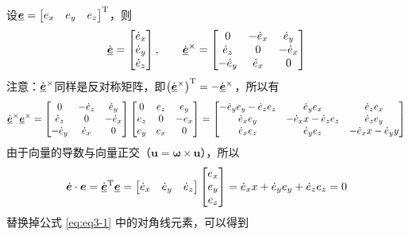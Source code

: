 \proof 设$\underline{\bm{e}} = \big[ e_x \quad e_y \quad e_z \big]^{\text{T}}$，则
\begin{equation*}
	\dot{\underline{\bm{e}}} =
	\begin{bmatrix}
		\dot{e}_x \\
		\dot{e}_y \\
		\dot{e}_z
	\end{bmatrix},
	\qquad 
	\dot{\underline{\bm{e}}}^\times =
	\begin{bmatrix}
		0 & - \dot{e}_x & \dot{e}_y \\
		\dot{e}_z & 0 & - \dot{e}_x \\
		-\dot{e}_y & \dot{e}_x & 0
	\end{bmatrix}
\end{equation*}
注意：$\dot{\underline{\bm{e}}}^\times$同样是反对称矩阵，即$\big( \dot{\underline{\bm{e}}}^\times \big)^{\text{T}} = - \dot{\underline{\bm{e}}}^\times$，所以有
\begin{equation}
	\dot{\underline{\bm{e}}}^\times \underline{\bm{e}}^\times = 
	\begin{bmatrix}
		0 & - \dot{e}_z & \dot{e}_y \\
		\dot{e}_z & 0 & - \dot{e}_x \\
		-\dot{e}_y & \dot{e}_x & 0
	\end{bmatrix}
	\begin{bmatrix}
		0 & e_z & e_y \\
		e_z & 0 & -e_x \\
		e_y & e_x & 0
	\end{bmatrix}
	=
	\begin{bmatrix}
		-\dot{e}_y e_y - \dot{e}_z e_z & \dot{e}_y e_x & \dot{e}_z e_x \\
		\dot{e}_x e_y & - \dot{e}_x x - \dot{e}_z e_z & \dot{e}_z e_y \\
		\dot{e}_x e_z & \dot{e}_y e_z & - \dot{e}_x x - \dot{e}_y y
	\end{bmatrix}
	\label{eq:eq3-1}
\end{equation}
由于向量的导数与向量正交（$\bm{u} = \bm{\omega} \times \bm{u}$），所以
\begin{equation}
	\dot{\bm{e}} \cdot \bm{e} = \dot{\underline{\bm{e}}}^{\text{T}} \underline{\bm{e}} = \big[ \dot{e}_x \quad \dot{e}_y \quad \dot{e}_z \big] 
	\begin{bmatrix}
		e_x \\
		e_y \\
		e_z
	\end{bmatrix}
	= \dot{e}_x x + \dot{e}_y e_y + \dot{e}_z e_z = 0
\end{equation}
替换掉公式 \eqref{eq:eq3-1} 中的对角线元素，可以得到
